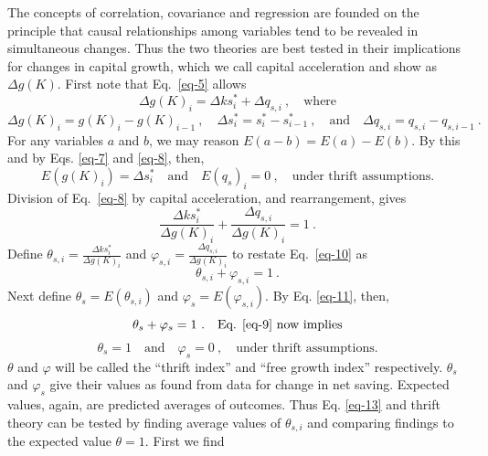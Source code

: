\documentclass[a4paper,fleqn]{latex_styles/cas-sc}
\begin{document}
The concepts of correlation, covariance and regression are founded on the principle that causal relationships among variables tend to be revealed in simultaneous changes. Thus the two theories are best tested in their
implications for changes in capital growth, which we call capital acceleration and show as $\Delta g(K)$. First note that Eq.~\eqref{eq-5} allows
%
\begin{equation}
\Delta g{(K)}_{i} = \Delta k s^{*}_{i} + \Delta q_{s,i}\ , \quad \text{where}\label{eq-8}
\end{equation}
%
\[\Delta g{(K)}_{i} = g{(K)}_{i} - g(K)_{i - 1} \ , \quad
\Delta s^{*}_{i} = s^{*}_{i} - s^{*}_{i - 1} \ , \quad \text{and} \quad
\Delta q_{s,i} = q_{s,i} - q_{s,i - 1} \ .\]
%
For any variables \(a\) and \(b\), we may reason
\(E(a - b) = E(a) - E(b)\). By this and by Eqs. \eqref{eq-7} and
\eqref{eq-8}, then,
%
\begin{equation}
    E(g(K)_i) = \Delta s^*_i \quad \text{and} \quad E(q_s)_i = 0\ , \quad \text{under thrift assumptions.}\label{eq-9}
\end{equation}
%
Division of Eq.~\eqref{eq-8} by capital acceleration, and rearrangement,
gives
%
\begin{equation}
\frac{\Delta k s^{*}_{i}}{\Delta g{(K)}_{i}} + \frac{\Delta q_{s,i}}{\Delta g{(K)}_{i}} = 1 \ .\label{eq-10}
\end{equation}
%
Define \(\theta_{s,i} = \frac{\Delta k s^{*}_{i}}{\Delta g{(K)}_{i}}\)
and \(\varphi_{s,i} = \frac{\Delta q_{s,i}}{\Delta g{(K)}_{i}}\) to
restate Eq.~\eqref{eq-10} as
%
\begin{equation}
\theta_{s,i} + \varphi_{s,i} = 1 \ .\label{eq-11}
\end{equation}
%
Next define \(\theta_s = E(\theta_{s,i})\) and \(\varphi_s = E(\varphi_{s,i})\). By Eq. \eqref{eq-11}, then,
%
\begin{equation}%
    \theta_s + \varphi_s = 1 \ . \quad \text{Eq. \eqref{eq-9} now implies}%
    \label{eq-12}%
\end{equation}%
%
\vspace{-5ex}%
%
\begin{equation}%
    \theta_s = 1 \quad \text{and} \quad \varphi_s = 0 \ , \quad \text{under thrift assumptions.}%
    \label{eq-13}%
\end{equation}%
%
\(\theta\) and \(\varphi\) will be called the ``thrift index'' and
``free growth index'' respectively. \(\theta_{s}\) and
\(\varphi_{s}\) give their values as found from data for change in net
saving. 
%
Expected values, again, are predicted averages of outcomes. Thus Eq. \eqref{eq-13} and thrift theory can be tested by finding average values of \(\theta_{s,i}\) and comparing findings to the expected value \(\theta = 1\). First we find
\end{document}
